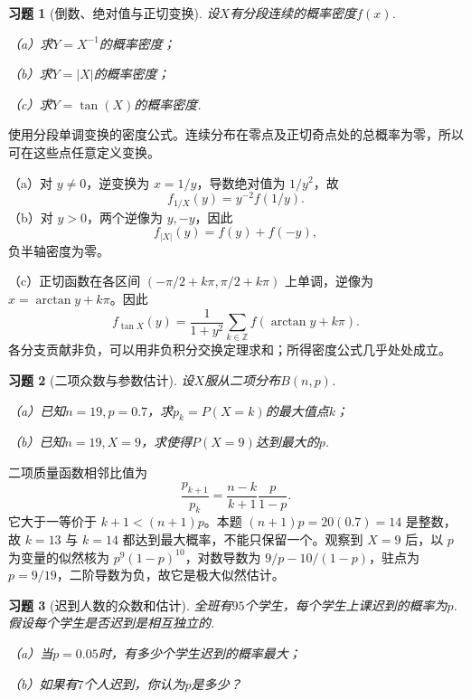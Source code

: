 \documentclass[12pt,fontset=fandol]{ctexart}
\newtheorem{exercise}{习题}[section]
\begin{document}
\begin{exercise}[倒数、绝对值与正切变换]\label{q:Y3.20}
设$X$有分段连续的概率密度$f(x)$.

（a）求$Y=X^{-1}$的概率密度；

（b）求$Y=|X|$的概率密度；

（c）求$Y=\tan(X)$的概率密度.\par{}
\end{exercise}

\begin{solve}\label{a:Y3.20}使用分段单调变换的密度公式。连续分布在零点及正切奇点处的总概率为零，所以可在这些点任意定义变换。\par（a）对 $y\ne0$，逆变换为 $x=1/y$，导数绝对值为 $1/y^2$，故\[f_{1/X}(y)=y^{-2}f(1/y).\]（b）对 $y>0$，两个逆像为 $y,-y$，因此\[f_{|X|}(y)=f(y)+f(-y),\]负半轴密度为零。\par（c）正切函数在各区间 $(-\pi/2+k\pi,\pi/2+k\pi)$ 上单调，逆像为 $x=\arctan y+k\pi$。因此\[f_{\tan X}(y)=\frac1{1+y^2}\sum_{k\in\mathbb Z}f(\arctan y+k\pi).\]各分支贡献非负，可以用非负积分交换定理求和；所得密度公式几乎处处成立。\end{solve}

\begin{exercise}[二项众数与参数估计]\label{q:Y3.21}
设$X$服从二项分布$B(n,p)$.

（a）已知$n=19,p=0.7$，求$p_k=P(X=k)$的最大值点$k$；

（b）已知$n=19,X=9$，求使得$P(X=9)$达到最大的$p$.\par{}
\end{exercise}

\begin{solve}\label{a:Y3.21}二项质量函数相邻比值为\[\frac{p_{k+1}}{p_k}=\frac{n-k}{k+1}\frac{p}{1-p}.\]它大于一等价于 $k+1<(n+1)p$。本题 $(n+1)p=20(0.7)=14$ 是整数，故 $k=13$ 与 $k=14$ 都达到最大概率，不能只保留一个。观察到 $X=9$ 后，以 $p$ 为变量的似然核为 $p^9(1-p)^{10}$，对数导数为 $9/p-10/(1-p)$，驻点为 $p=9/19$，二阶导数为负，故它是极大似然估计。\end{solve}

\begin{exercise}[迟到人数的众数和估计]\label{q:Y3.22}
全班有$95$个学生，每个学生上课迟到的概率为$p$.假设每个学生是否迟到是相互独立的.

（a）当$p=0.05$时，有多少个学生迟到的概率最大；

（b）如果有$7$个人迟到，你认为$p$是多少？\par{}
\end{exercise}
\end{document}
